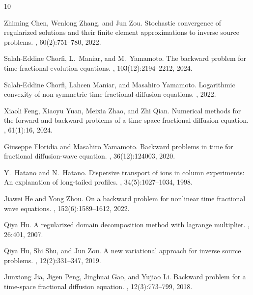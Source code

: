 \documentclass[11pt]{article}
\numberwithin{equation}{section}
\begin{document}
\begin{thebibliography}{10}

Zhiming Chen, Wenlong Zhang, and Jun Zou.
\newblock Stochastic convergence of regularized solutions and their finite
  element approximations to inverse source problems.
, 60(2):751--780, 2022.

Salah-Eddine Chorfi, L.~Maniar, and M.~Yamamoto.
\newblock The backward problem for time-fractional evolution equations.
, 103(12):2194--2212, 2024.

Salah-Eddine Chorfi, Lahcen Maniar, and Masahiro Yamamoto.
\newblock Logarithmic convexity of non-symmetric time-fractional diffusion
  equations.
, 2022.

Xiaoli Feng, Xiaoyu Yuan, Meixia Zhao, and Zhi Qian.
\newblock Numerical methods for the forward and backward problems of a
  time-space fractional diffusion equation.
, 61(1):16, 2024.

Giuseppe Floridia and Masahiro Yamamoto.
\newblock Backward problems in time for fractional diffusion-wave equation.
, 36(12):124003, 2020.

Y.~Hatano and N.~Hatano.
\newblock Dispersive transport of ions in column experiments: An explanation of
  long-tailed profiles.
, 34(5):1027--1034, 1998.

Jiawei He and Yong Zhou.
\newblock On a backward problem for nonlinear time fractional wave equations.
, 152(6):1589--1612, 2022.

Qiya Hu.
\newblock A regularized domain decomposition method with lagrange multiplier.
, 26:401, 2007.

Qiya Hu, Shi Shu, and Jun Zou.
\newblock A new variational approach for inverse source problems.
,
  12(2):331--347, 2019.

Junxiong Jia, Jigen Peng, Jinghuai Gao, and Yujiao Li.
\newblock Backward problem for a time-space fractional diffusion equation.
, 12(3):773--799, 2018.


\end{thebibliography}
\end{document}
